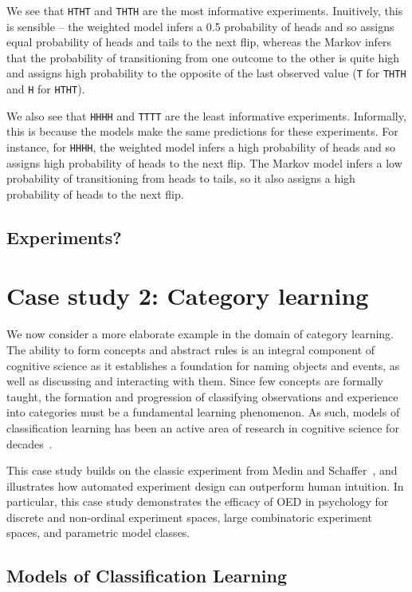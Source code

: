 \documentclass{article}
\begin{document}
We see that \lstinline{HTHT} and \lstinline{THTH} are the most informative experiments.
Inuitively, this is sensible -- the weighted model infers a 0.5 probability of heads and so assigns equal probability of heads and tails to the next flip, whereas the Markov infers that the probability of transitioning from one outcome to the other is quite high and assigns high probability to the opposite of the last observed value (\lstinline{T} for \lstinline{THTH} and \lstinline{H} for \lstinline{HTHT}).

We also see that \lstinline{HHHH} and \lstinline{TTTT} are the least informative experiments.
Informally, this is because the models make the same predictions for these experiments.
For instance, for \lstinline{HHHH}, the weighted model infers a high probability of heads and so assigns high probability of heads to the next flip.
The Markov model infers a low probability of transitioning from heads to tails, so it also assigns a high probability of heads to the next flip.

\subsection{Experiments?}


\section{Case study 2: Category learning}

We now consider a more elaborate example in the domain of category learning. The ability to form concepts and abstract rules is an integral component of cognitive science as it establishes a foundation for naming objects and events, as well as discussing and interacting with them. Since few concepts are formally taught, the formation and progression of classifying observations and experience into categories must be a fundamental learning phenomenon. As such, models of classification learning has been an active area of research in cognitive science for decades~\cite{machery10:bbs}.

 This case study builds on the classic experiment from Medin and Schaffer~\cite{medin78:pr}, and illustrates how automated experiment design can outperform human intuition. In particular, this case study demonstrates the efficacy of OED in psychology for discrete and non-ordinal experiment spaces, large combinatoric experiment spaces, and parametric model classes.

\subsection{Models of Classification Learning}
\end{document}
